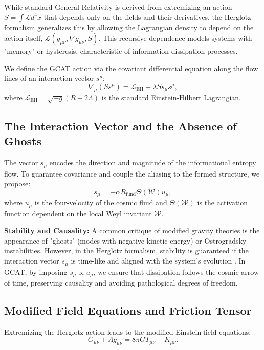\documentclass[12pt, a4paper]{article}
\theoremstyle{plain}
\theoremstyle{definition}
\begin{document}
While standard General Relativity is derived from extremizing an action $S = \int \mathcal{L} d^4x$ that depends only on the fields and their derivatives, the Herglotz formalism generalizes this by allowing the Lagrangian density to depend on the action itself, $\mathcal{L}(g_{\mu\nu}, \nabla g_{\mu\nu}, S)$. This recursive dependence models systems with "memory" or hysteresis, characteristic of information dissipation processes.

We define the GCAT action via the covariant differential equation along the flow lines of an interaction vector $s^\mu$:
\begin{equation}
\nabla_\mu (S s^\mu) = \mathcal{L}_{\text{EH}} - \lambda S s_\mu s^\mu,
\end{equation}
where $\mathcal{L}_{\text{EH}} = \sqrt{-g}(R - 2\Lambda)$ is the standard Einstein-Hilbert Lagrangian.

\subsection{The Interaction Vector and the Absence of Ghosts}

The vector $s_\mu$ encodes the direction and magnitude of the informational entropy flow. To guarantee covariance and couple the aliasing to the formed structure, we propose:
\begin{equation}
s_\mu = -\alpha R_{\text{fund}} \Theta(\mathcal{W}) u_\mu,
\end{equation}
where $u_\mu$ is the four-velocity of the cosmic fluid and $\Theta(\mathcal{W})$ is the activation function dependent on the local Weyl invariant $\mathcal{W}$.

\textbf{Stability and Causality:} A common critique of modified gravity theories is the appearance of "ghosts" (modes with negative kinetic energy) or Ostrogradsky instabilities. However, in the Herglotz formalism, stability is guaranteed if the interaction vector $s_\mu$ is time-like and aligned with the system's evolution \cite{Lazo2017}. In GCAT, by imposing $s_\mu \propto u_\mu$, we ensure that dissipation follows the cosmic arrow of time, preserving causality and avoiding pathological degrees of freedom.

\subsection{Modified Field Equations and Friction Tensor}

Extremizing the Herglotz action leads to the modified Einstein field equations:
\begin{equation}
G_{\mu\nu} + \Lambda g_{\mu\nu} = 8\pi G T_{\mu\nu} + K_{\mu\nu}.
\label{eq:field_equations}
\end{equation}
\end{document}
